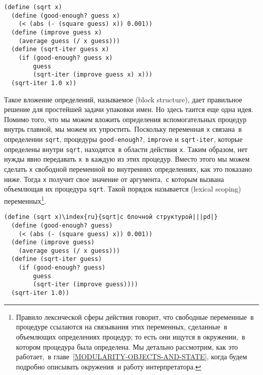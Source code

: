 \begin{Verbatim}[fontsize=\small]
(define (sqrt x)
  (define (good-enough? guess x)
    (< (abs (- (square guess) x)) 0.001))
  (define (improve guess x)
    (average guess (/ x guess)))
  (define (sqrt-iter guess x)
    (if (good-enough? guess x)
        guess
        (sqrt-iter (improve guess x) x)))
  (sqrt-iter 1.0 x))
\end{Verbatim}
Такое вложение определений, называемое  (block struc\-ture), дает правильное решение для
простейшей задачи упаковки имен.  Но здесь таится еще одна идея.
Помимо того, что мы можем вложить определения вспомогательных процедур 
внутрь главной, мы можем их упростить. Поскольку переменная
{\tt x} связана~в определении {\tt sqrt}, процедуры
{\tt good-enough?}, {\tt improve} и
{\tt sqrt-iter}, которые определены внутри {\tt sqrt},
находятся~в области действия {\tt x}. Таким образом, нет нужды
явно передавать {\tt x}~в каждую из этих процедур.  Вместо
этого мы можем сделать {\tt x} свободной переменной во
внутренних определениях, как это показано ниже. Тогда {\tt x}
получит свое значение от аргумента,~с которым вызвана объемлющая их
процедура {\tt sqrt}. Такой порядок называется 
 (lexical scoping)
переменных\footnote{Правило лексической сферы действия говорит, что свободные
переменные~в процедуре ссылаются на связывания этих переменных,
сделанные~в объемлющих определениях процедур; то есть они ищутся в
окружении,~в котором процедура была определена. Мы детально
рассмотрим, как это работает,~в главе~\ref{MODULARITY-OBJECTS-AND-STATE}, когда будем 
подробно описывать окружения~и работу интерпретатора.
}.

\begin{Verbatim}[fontsize=\small]
(define (sqrt x)\index{ru}{sqrt|с блочной структурой|||pd|}
  (define (good-enough? guess)
    (< (abs (- (square guess) x)) 0.001))
  (define (improve guess)
    (average guess (/ x guess)))
  (define (sqrt-iter guess)
    (if (good-enough? guess)
        guess
        (sqrt-iter (improve guess))))
  (sqrt-iter 1.0))
\end{Verbatim}

